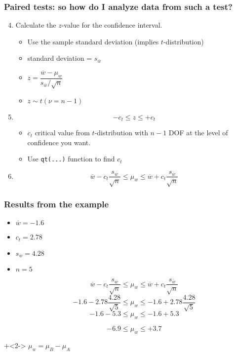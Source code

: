 \begin{frame}\frametitle{Paired tests: so how do I analyze data from such a test?}
	\begin{enumerate}
		\setcounter{enumi}{3}
		\item	Calculate the $z$-value for the confidence interval. 
		
		\begin{itemize}
			\item	Use the sample standard deviation (implies $t$-distribution)
			\item	standard deviation = $s_{\overline{w}}$
			
			\vspace{12pt}
			\item	$z = \dfrac{\overline{w} - \mu_w}{s_{\overline{w}} / \sqrt{n}}$
			\vspace{6pt}
			\item	$z \sim t(\nu=n-1)$
		\end{itemize}
		
		\pause
		\item	\[-c_t \leq z \leq + c_t\]
		\begin{itemize}
			\item	$c_t$ critical value from $t$-distribution with $n-1$ DOF at the level of confidence you want.
			\item	Use \texttt{qt(...)} function to find $c_t$
		\end{itemize}
		
		\pause
		\item	\[\overline{w} - c_t \dfrac{s_{\overline{w}}}{\sqrt{n}} \leq \mu_w \leq \overline{w} + c_t \dfrac{s_{\overline{w}}}{\sqrt{n}}\]
	\end{enumerate}
\end{frame}

\begin{frame}\frametitle{Results from the example}
	\begin{itemize}
		\item	$\overline{w} =  -1.6$
		\item	$c_t = 2.78$
		\item	$s_{\overline{w}} = 4.28$
		\item	$n=5$
		
			\[\overline{w} - c_t \dfrac{s_{\overline{w}}}{\sqrt{n}} \leq \mu_w \leq \overline{w} + c_t \dfrac{s_{\overline{w}}}{\sqrt{n}}\]
			\[-1.6 - 2.78 \dfrac{4.28}{\sqrt{5}} \leq \mu_w \leq -1.6 + 2.78 \dfrac{4.28}{\sqrt{5}}\]
			\[-1.6 - 5.3 \leq \mu_w \leq -1.6 +5.3\]
			
			\[-6.9 \leq \mu_w \leq +3.7\]
	\end{itemize}
	
	\onslide+<2->{
		$\mu_w = \mu_B - \mu_A$	
	}
\end{frame}


